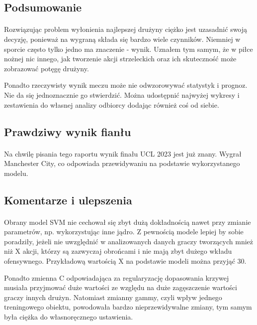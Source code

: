 \documentclass[12pt, letterpaper]{article}
\begin{document}
\subsection{Podsumowanie}
\paragraph{} Rozwiązując problem wyłonienia najlepszej drużyny ciężko jest uzasadnić swoją decyzję, ponieważ na wygraną składa się bardzo wiele czynników. Niemniej w sporcie często tylko jedno ma znaczenie - wynik. Uznałem tym samym, że w piłce nożnej nic innego, jak tworzenie akcji strzeleckich oraz ich skuteczność może zobrazować potęgę drużyny. \par Ponadto rzeczywisty wynik meczu może nie odwzorowywać statystyk i prognoz. Nie da się jednoznacznie go stwierdzić. Można udostępnić najwyżej wykresy i zestawienia do własnej analizy odbiorcy dodając również coś od siebie.
\subsection{Prawdziwy wynik fianłu}
\paragraph{} Na chwilę pisania tego raportu wynik finału UCL 2023 jest już znany. Wygrał Manchester City, co odpowiada przewidywaniu na podstawie wykorzystanego modelu.
\subsection{Komentarze i ulepszenia}
\paragraph{} Obrany model SVM nie cechował się zbyt dużą dokładnością nawet przy zmianie parametrów, np. wykorzystując inne jądro. Z pewnością modele lepiej by sobie poradziły, jeżeli nie uwzględnić w analizowanych danych graczy tworzących mnież niż X akcji, którzy są zazwyczaj obrońcami i nie mają zbyt dużego wkładu ofensywnego. Przykładową wartością X na podstawie modeli można przyjąć 30. \par Ponadto zmienna C odpowiadająca za regularyzację dopasowania krzywej musiała przyjmować duże wartości ze względu na duże zagęszczenie wartości graczy innych drużyn. Natomiast zmianny gammy, czyli wpływ jednego treningowego obiektu, powodowała bardzo nieprzewidywalne zmiany, tym samym była ciężka do własnoręcznego ustawienia.



\end{document}
